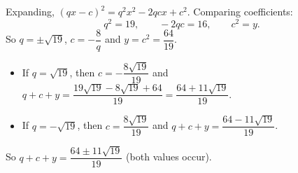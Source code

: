 Expanding, $(qx-c)^2=q^2x^2-2qcx+c^2$. Comparing coefficients:
\[
q^2=19,\qquad -2qc=16,\qquad c^2=y .
\]
So $q=\pm\sqrt{19}$, $c=-\dfrac{8}{q}$ and $y=c^2=\dfrac{64}{19}$.
\begin{itemize}
\item If $q=\sqrt{19}$, then $c=-\dfrac{8\sqrt{19}}{19}$ and $q+c+y=\dfrac{19\sqrt{19}-8\sqrt{19}+64}{19}=\dfrac{64+11\sqrt{19}}{19}$.
\item If $q=-\sqrt{19}$, then $c=\dfrac{8\sqrt{19}}{19}$ and $q+c+y=\dfrac{64-11\sqrt{19}}{19}$.
\end{itemize}
So $q+c+y=\boxed{\dfrac{64\pm11\sqrt{19}}{19}}$ (both values occur).
